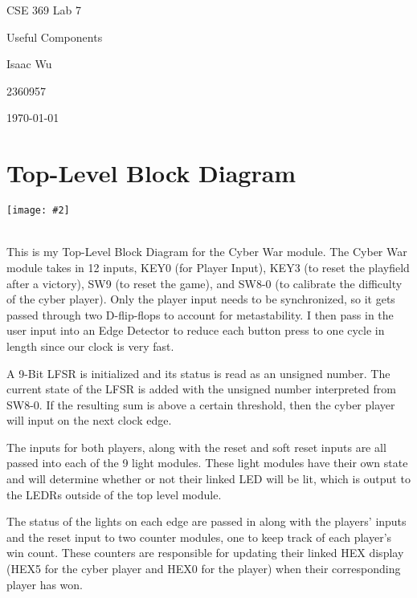 \documentclass{article}
\date{}
\newenvironment{solution}{\begin{mdframed}[style=SolutionFrame]}{\end{mdframed}}
\newcommand{\img}[2][1.0]{
    \begin{minipage}[t]{0.9\linewidth}
        \begin{center}
            \texttt{[image: \#2]}
        \end{center}
    \end{minipage}
}
\begin{document}
    \begin{titlepage}
        \centering
        \null
        \vspace{5cm}
        {\Huge CSE 369 Lab 7\par}
        \vspace{0.5cm}
        {\Large Useful Components \par}
        \vfill
        {\hfill \Large Isaac Wu \par}
        {\hfill \large 2360957 \par}
        {\hfill \large \today \par}
    \end{titlepage}

\section{Top-Level Block Diagram}
    \begin{solution}
        \img[1.1]{block_diagram.png} \\
        
        This is my Top-Level Block Diagram for the Cyber War module. The Cyber War module takes in 12 inputs, KEY0 (for Player Input), KEY3 (to reset the playfield after a victory), SW9 (to reset the game), and SW8-0 (to calibrate the difficulty of the cyber player). Only the player input needs to be synchronized, so it gets passed through two D-flip-flops to account for metastability. I then pass in the user input into an Edge Detector to reduce each button press to one cycle in length since our clock is very fast.
        
        A 9-Bit LFSR is initialized and its status is read as an unsigned number. The current state of the LFSR is added with the unsigned number interpreted from SW8-0. If the resulting sum is above a certain threshold, then the cyber player will input on the next clock edge.
        
        The inputs for both players, along with the reset and soft reset inputs are all passed into each of the 9 light modules. These light modules have their own state and will determine whether or not their linked LED will be lit, which is output to the LEDRs outside of the top level module.
        
        The status of the lights on each edge are passed in along with the players' inputs and the reset input to two counter modules, one to keep track of each player's win count. These counters are responsible for updating their linked HEX display (HEX5 for the cyber player and HEX0 for the player) when their corresponding player has won.
    \end{solution}
\end{document}
